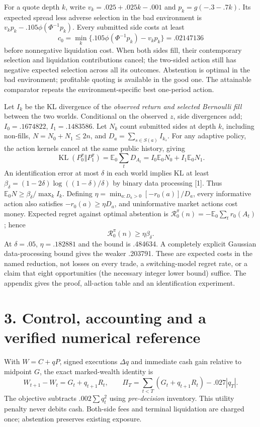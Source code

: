 \documentclass[11pt,a4paper]{article}
\newcommand{\E}{\mathbb E}
\newcommand{\KL}{\operatorname{KL}}
\begin{document}
For a quote depth $k$, write $v_k=.025+.025k-.001$ and $p_k=g(-.3-.7k)$.
Its expected spread less adverse selection in the bad environment is
$v_kp_k-.105\phi(\Phi^{-1}p_k)$. Every submitted side costs at least
\[
c_0=\min_k\{.105\phi(\Phi^{-1}p_k)-v_kp_k\}=.02147136
\]
before nonnegative liquidation cost. When both sides fill, their contemporary
selection and liquidation contributions cancel; the two-sided action still has
negative expected selection across all its outcomes. Abstention is
optimal in the bad environment; profitable quoting is available in the good one.
The attainable comparator repeats the environment-specific best one-period action.

Let $I_k$ be the KL divergence of the \emph{observed return and selected Bernoulli
fill} between the two worlds. Conditional on the observed $z$, side divergences
add; $I_0=.1674822$, $I_1=.1483586$. Let $N_k$ count submitted sides at depth $k$,
including non-fills, $N=N_0+N_1\le2n$, and $D_a=\sum_{s\in S(a)}I_{k_s}$.
For any adaptive policy, the action kernels
cancel at the same public history, giving
\[
\KL(P_0^\pi\Vert P_1^\pi)=\E_0\sum_tD_{A_t}
=I_0\E_0N_0+I_1\E_0N_1.
\]
An identification error at most $\delta$ in each world implies KL at least
$\beta_\delta=(1-2\delta)\log((1-\delta)/\delta)$ by binary data processing [1].
Thus $\E_0N\ge\beta_\delta/\max_k I_k$. Defining
$\eta=\min_{a:D_a>0}[-r_0(a)]/D_a$, every informative action also satisfies
$-r_0(a)\ge\eta D_a$, and uninformative market actions cost money. Expected
regret against optimal abstention is $\mathcal R_0^\pi(n)=-\E_0\sum_t r_0(A_t)$; hence
\[
\boxed{\mathcal R_0^\pi(n)\ge\eta\beta_\delta.}
\]
At $\delta=.05$, $\eta=.182881$ and the bound is .484634. A completely explicit
Gaussian data-processing bound gives the weaker .203791. These are expected
costs in the named reduction, not losses on every trade, a switching-model regret
rate, or a claim that eight opportunities (the necessary integer lower bound)
suffice. The appendix gives the proof, all-action table and an identification experiment.

\newpage
\section*{3. Control, accounting and a verified numerical reference}
With $W=C+qP$, signed executions $\Delta q$ and immediate cash gain relative to
midpoint $G$, the exact marked-wealth identity is
\[
W_{t+1}-W_t=G_t+q_{t+1}R_t,\qquad
\Pi_T=\sum_{t<T}(G_t+q_{t+1}R_t)-.027|q_T|.
\]
The objective subtracts $.002\sum q_t^2$ using \emph{pre-decision} inventory.
This utility penalty never debits cash. Both-side fees and terminal liquidation
are charged once; abstention preserves existing exposure.
\end{document}
